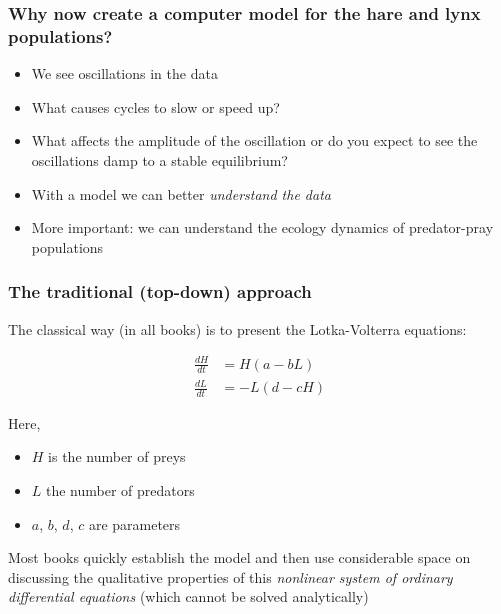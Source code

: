\documentclass{beamer}
\begin{document}
\begin{frame}
\frametitle{Why now create a computer model for the hare and lynx populations?}

\begin{block}{}
\begin{itemize}
 \item We see oscillations in the data

 \item What causes cycles to slow or speed up?

 \item What affects the amplitude of the oscillation or do you expect to see the oscillations damp to a stable equilibrium?

 \item With a model we can better \emph{understand the data}

 \item More important: we can understand the ecology dynamics of
   predator-pray populations
\end{itemize}

\noindent
\end{block}
\end{frame}

\begin{frame}
\frametitle{The traditional (top-down) approach}

\begin{block}{}
The classical way (in all books) is to present the Lotka-Volterra equations:

\begin{align*}
\frac{dH}{dt} &= H(a - b L)\\ 
\frac{dL}{dt} &= - L(d - c  H)
\end{align*}

Here,

\begin{itemize}
 \item $H$ is the number of preys

 \item $L$ the number of predators

 \item $a$, $b$, $d$, $c$ are parameters
\end{itemize}

\noindent
Most books quickly establish the model and then use considerable space on
discussing the qualitative properties of this \emph{nonlinear system of
ordinary differential equations} (which cannot be solved analytically)
\end{block}
\end{frame}
\end{document}
